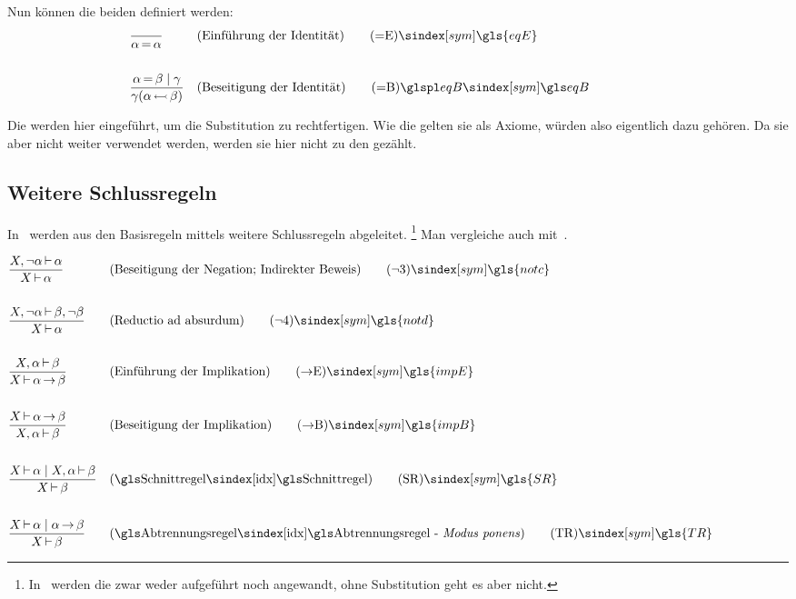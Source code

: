 Nun können die beiden  definiert werden:
\begin{align}
	& \frac{}{\alpha\eq\alpha}
	& & (\text{Einführung der Identität})
	\tag{\tageqE} \sym{\gls{eqE}} \label{def:eqE}
	\\\\
	& \frac{\alpha\eq\beta \und \gamma}{\gamma(\alpha\subst\beta)}
	& & (\text{Beseitigung der Identität})
	\tag{\tageqB} \glsSym{eqB} \label{def:eqB}
	\formulatoleft
\end{align}

Die  werden hier eingeführt, um die Substitution zu rechtfertigen.
Wie die  gelten sie als Axiome, würden also eigentlich dazu gehören.
Da sie aber nicht weiter verwendet werden, werden sie hier nicht zu den  gezählt.

\subsection{Weitere Schlussregeln}%
\label{sub:Schlussregeln}

In~\cite{bib:Rautenberg} werden aus den Basisregeln mittels  weitere Schlussregeln abgeleitet.%
\footnote{%
In~\cite{bib:Rautenberg} werden die  zwar weder aufgeführt noch angewandt, ohne Substitution geht es aber nicht.
}
Man vergleiche auch mit~\cite{bib:NatuerlichesSchliessen}.

\begin{align}
	& \frac{X,\lnot\alpha\abltb\alpha}{X\abltb\alpha}
	& & (\text{Beseitigung der Negation; Indirekter Beweis})
	\tag{\tagnotc} \sym{\gls{notc}} \label{def:notc}
	\\\\
	& \frac{X,\lnot\alpha\abltb\beta,\lnot\beta}{X\abltb\alpha}
	& & (\text{Reductio ad absurdum})
	\tag{\tagnotd} \sym{\gls{notd}} \label{def:notd}
	\\\\
	& \frac{X,\alpha\abltb\beta}{X\abltb\alpha\limp\beta}
	& & (\text{Einführung der Implikation})
	\tag{\tagimpE} \sym{\gls{impE}} \label{def:impE}
	\\\\
	& \frac{X\abltb\alpha\limp\beta}{X,\alpha\abltb\beta}
	& & (\text{Beseitigung der Implikation})
	\tag{\tagimpB} \sym{\gls{impB}} \label{def:impB}
	\\\\
	& \frac{X\abltb\alpha \und X,\alpha\abltb\beta}{X\abltb\beta}
	& & (\text{\glsIdx{Schnittregel}})
	\tag{\tagSR} \sym{\gls{SR}} \label{def:SR}
	\\\\
	& \frac{X\abltb\alpha \und \alpha\limp\beta}{X\abltb\beta}
	& & (\text{\glsIdx{Abtrennungsregel} - \emph{Modus ponens}})
	\tag{\tagTR} \sym{\gls{TR}} \label{def:TR}
	\formulatoleft
\end{align}


